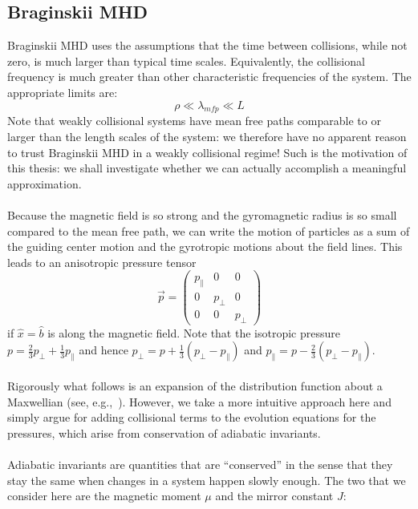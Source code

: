 
\subsection{Braginskii MHD} \label{ssec:bragMHD}
Braginskii MHD uses the assumptions that the time between collisions, while not zero, is much larger than typical time scales. Equivalently, the collisional frequency is much greater than other characteristic frequencies of the system. The appropriate limits are:
\begin{equation}
  \rho\ll\lambda_{mfp}\ll L \label{eq:bragord}
\end{equation}
Note that weakly collisional systems have mean free paths comparable to or larger than the length scales of the system: we therefore have no apparent reason to trust Braginskii MHD in a weakly collisional regime! Such is the motivation of this thesis: we shall investigate whether we can actually accomplish a meaningful approximation.\\
\\
Because the magnetic field is so strong and the gyromagnetic radius is so small compared to the mean free path, we can write the motion of particles as a sum of the guiding center motion and the gyrotropic motions about the field lines. This leads to an anisotropic pressure tensor
\begin{equation}
  \vec{p}=
  \begin{pmatrix}
  p_\parallel & 0 & 0\\
  0 & p_\perp & 0\\
  0 & 0 & p_\perp
  \end{pmatrix}
\end{equation}
if $\hat x=\hat b$ is along the magnetic field. Note that the isotropic pressure $p=\frac23p_\perp+\frac13p_\parallel$ and hence $p_\perp=p+\frac13(p_\perp-p_\parallel)$ and $p_\parallel=p-\frac23(p_\perp-p_\parallel)$. \\
\\
Rigorously what follows is an expansion of the distribution function about a Maxwellian (see, e.g.,~\cite{Negulescu2016}). However, we take a more intuitive approach here and simply argue for adding collisional terms to the evolution equations for the pressures, which arise from conservation of adiabatic invariants.\\
\\
Adiabatic invariants are quantities that are ``conserved'' in the sense that they stay the same when changes in a system happen slowly enough. The two that we consider here are the magnetic moment $\mu$ and the mirror constant $J$:
